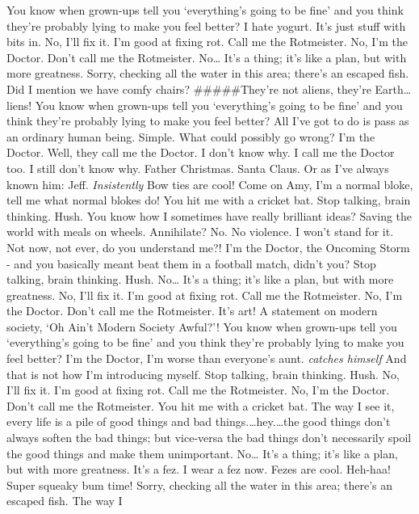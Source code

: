 You know when grown-ups tell you `everything's going to be fine' and you
think they're probably lying to make you feel better? I hate yogurt.
It's just stuff with bits in. No, I'll fix it. I'm good at fixing rot.
Call me the Rotmeister. No, I'm the Doctor. Don't call me the
Rotmeister. No\ldots{} It's a thing; it's like a plan, but with more
greatness. Sorry, checking all the water in this area; there's an
escaped fish. Did I mention we have comfy chairs? \#\#\#\#\#They're not
aliens, they're Earth\ldots{}liens!\newline
You know when grown-ups tell you `everything's going to be fine' and you
think they're probably lying to make you feel better? All I've got to do
is pass as an ordinary human being. Simple. What could possibly go
wrong? I'm the Doctor. Well, they call me the Doctor. I don't know why.
I call me the Doctor too. I still don't know why. Father Christmas.
Santa Claus. Or as I've always known him: Jeff. \emph{Insistently} Bow
ties are cool! Come on Amy, I'm a normal bloke, tell me what normal
blokes do! You hit me with a cricket bat. Stop talking, brain thinking.
Hush. You know how I sometimes have really brilliant ideas? Saving the
world with meals on wheels. Annihilate? No. No violence. I won't stand
for it. Not now, not ever, do you understand me?! I'm the Doctor, the
Oncoming Storm - and you basically meant beat them in a football match,
didn't you? Stop talking, brain thinking. Hush. No\ldots{} It's a thing;
it's like a plan, but with more greatness. No, I'll fix it. I'm good at
fixing rot. Call me the Rotmeister. No, I'm the Doctor. Don't call me
the Rotmeister. It's art! A statement on modern society, `Oh Ain't
Modern Society Awful?'! You know when grown-ups tell you `everything's
going to be fine' and you think they're probably lying to make you feel
better? I'm the Doctor, I'm worse than everyone's aunt. \emph{catches
himself} And that is not how I'm introducing myself. Stop talking, brain
thinking. Hush. No, I'll fix it. I'm good at fixing rot. Call me the
Rotmeister. No, I'm the Doctor. Don't call me the Rotmeister. You hit me
with a cricket bat. The way I see it, every life is a pile of good
things and bad things.\ldots{}hey.\ldots{}the good things don't always
soften the bad things; but vice-versa the bad things don't necessarily
spoil the good things and make them unimportant. No\ldots{} It's a
thing; it's like a plan, but with more greatness. It's a fez. I wear a
fez now. Fezes are cool. Heh-haa! Super squeaky bum time! Sorry,
checking all the water in this area; there's an escaped fish. The way I
